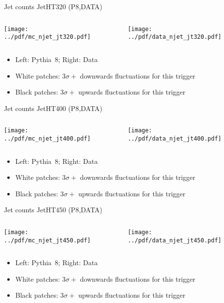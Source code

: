 \documentclass[9pt]{beamer}
\begin{document}
\begin{frame}[t]{Jet counts JetHT320 (P8,DATA)}
\begin{columns}[T]
  \begin{column}{.5\textwidth}
  \texttt{[image: ../pdf/mc\_njet\_jt320.pdf]}
  \end{column}
  \begin{column}{.5\textwidth}
  \texttt{[image: ../pdf/data\_njet\_jt320.pdf]}
  \end{column}
\end{columns}
\begin{itemize}
 \item Left: Pythia~8; Right: Data
 \item White patches: $3\sigma+$ downwards fluctuations for this trigger
 \item Black patches: $3\sigma+$ upwards fluctuations for this trigger
\end{itemize}
\end{frame}

\begin{frame}[t]{Jet counts JetHT400 (P8,DATA)}
\begin{columns}[T]
  \begin{column}{.5\textwidth}
  \texttt{[image: ../pdf/mc\_njet\_jt400.pdf]}
  \end{column}
  \begin{column}{.5\textwidth}
  \texttt{[image: ../pdf/data\_njet\_jt400.pdf]}
  \end{column}
\end{columns}
\begin{itemize}
 \item Left: Pythia~8; Right: Data
 \item White patches: $3\sigma+$ downwards fluctuations for this trigger
 \item Black patches: $3\sigma+$ upwards fluctuations for this trigger
\end{itemize}
\end{frame}

\begin{frame}[t]{Jet counts JetHT450 (P8,DATA)}
\begin{columns}[T]
  \begin{column}{.5\textwidth}
  \texttt{[image: ../pdf/mc\_njet\_jt450.pdf]}
  \end{column}
  \begin{column}{.5\textwidth}
  \texttt{[image: ../pdf/data\_njet\_jt450.pdf]}
  \end{column}
\end{columns}
\begin{itemize}
 \item Left: Pythia~8; Right: Data
 \item White patches: $3\sigma+$ downwards fluctuations for this trigger
 \item Black patches: $3\sigma+$ upwards fluctuations for this trigger
\end{itemize}
\end{frame}
\end{document}
